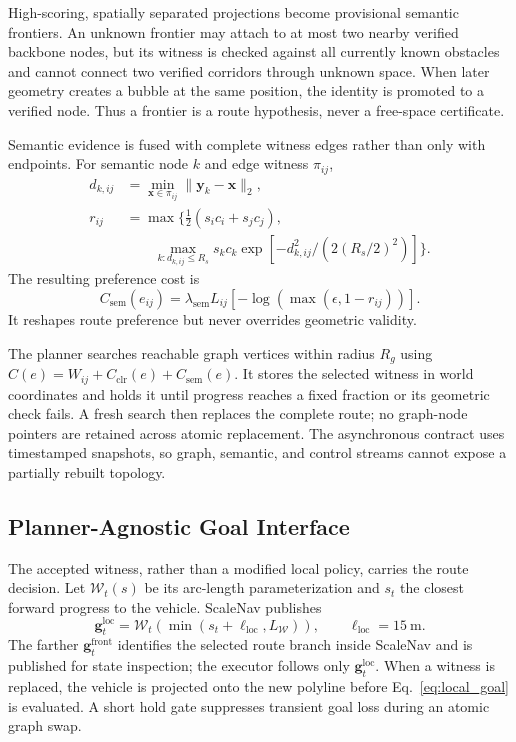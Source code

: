 \documentclass[letterpaper,10pt,conference]{ieeeconf}
\newcommand{\vect}[1]{\boldsymbol{#1}}
\begin{document}
High-scoring, spatially separated projections become provisional semantic
frontiers.  An unknown frontier may attach to at most two nearby verified
backbone nodes, but its witness is checked against all currently known
obstacles and cannot connect two verified corridors through unknown space.
When later geometry creates a bubble at the same position, the identity is
promoted to a verified node.  Thus a frontier is a route hypothesis, never a
free-space certificate.

Semantic evidence is fused with complete witness edges rather than only with
endpoints.  For semantic node $k$ and edge witness $\pi_{ij}$,
\begin{equation}
\begin{aligned}
 d_{k,ij}&=\min_{\vect{x}\in\pi_{ij}}
             \|\vect{y}_k-\vect{x}\|_2,\\
 r_{ij}&=\max\Big\{\tfrac12(s_i c_i+s_jc_j),\\[-2pt]
 &\qquad \max_{k:d_{k,ij}\le R_s}s_kc_k
 \exp[-d_{k,ij}^2/(2(R_s/2)^2)]\Big\}.
\end{aligned}
\label{eq:semantic_fusion}
\end{equation}
The resulting preference cost is
\begin{equation}
 C_{\mathrm{sem}}(e_{ij})=
 \lambda_{\mathrm{sem}}L_{ij}
 [-\log(\max(\epsilon,1-r_{ij}))].
\label{eq:semantic_cost}
\end{equation}
It reshapes route preference but never overrides geometric validity.

The planner searches reachable graph vertices within radius $R_g$ using
$C(e)=W_{ij}+C_{\mathrm{clr}}(e)+C_{\mathrm{sem}}(e)$.  It stores the selected
witness in world coordinates and holds it until progress reaches a fixed
fraction or its geometric check fails.  A fresh search then replaces the
complete route; no graph-node pointers are retained across atomic replacement.
The asynchronous contract uses timestamped snapshots, so graph, semantic, and
control streams cannot expose a partially rebuilt topology.
\subsection{Planner-Agnostic Goal Interface}
\label{sec:interface}
The accepted witness, rather than a modified local policy, carries the route
decision.  Let $\mathcal{W}_t(s)$ be its arc-length parameterization and
$s_t$ the closest forward progress to the vehicle.  ScaleNav publishes
\begin{equation}
 \vect{g}^{\mathrm{loc}}_t=
 \mathcal{W}_t\!\left(\min(s_t+\ell_{\mathrm{loc}},L_{\mathcal W})\right),
 \qquad \ell_{\mathrm{loc}}=15~\mathrm{m}.
\label{eq:local_goal}
\end{equation}
The farther $\vect{g}^{\mathrm{front}}_t$ identifies the selected route branch
inside ScaleNav and is published for state inspection; the executor follows
only $\vect{g}^{\mathrm{loc}}_t$.  When a witness is replaced, the vehicle is
projected onto the new polyline before Eq.~\eqref{eq:local_goal} is evaluated.
A short hold gate suppresses transient goal loss during an atomic graph swap.
\end{document}
